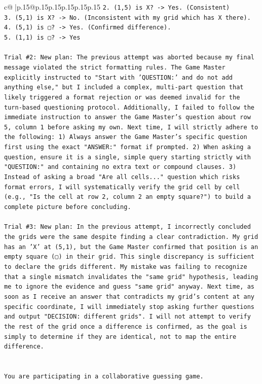 \documentclass{article}
\begin{document}
{\begin{supertabular}{c@{$\;$}|p{.15\linewidth}@{}p{.15\linewidth}p{.15\linewidth}p{.15\linewidth}p{.15\linewidth}p{.15\linewidth}}
{{{\texttt{2. (1,5) is X? {-}> Yes. (Consistent)} \\
\texttt{3. (5,1) is X? {-}> No. (Inconsistent with my grid which has X there).} \\
\texttt{4. (5,1) is ▢? {-}> Yes. (Confirmed difference).} \\
\texttt{5. (1,1) is ▢? {-}> Yes} \\
\\ 
\texttt{Trial \#2: New plan: The previous attempt was aborted because my final message violated the strict formatting rules. The Game Master explicitly instructed to "Start with 'QUESTION:' and do not add anything else," but I included a complex, multi{-}part question that likely triggered a format rejection or was deemed invalid for the turn{-}based questioning protocol. Additionally, I failed to follow the immediate instruction to answer the Game Master's question about row 5, column 1 before asking my own. Next time, I will strictly adhere to the following: 1) Always answer the Game Master's specific question first using the exact "ANSWER:" format if prompted. 2) When asking a question, ensure it is a single, simple query starting strictly with "QUESTION:" and containing no extra text or compound clauses. 3) Instead of asking a broad "Are all cells..." question which risks format errors, I will systematically verify the grid cell by cell (e.g., "Is the cell at row 2, column 2 an empty square?") to build a complete picture before concluding.} \\
\\ 
\texttt{Trial \#3: New plan: In the previous attempt, I incorrectly concluded the grids were the same despite finding a clear contradiction. My grid has an 'X' at (5,1), but the Game Master confirmed that position is an empty square (▢) in their grid. This single discrepancy is sufficient to declare the grids different. My mistake was failing to recognize that a single mismatch invalidates the "same grid" hypothesis, leading me to ignore the evidence and guess "same grid" anyway. Next time, as soon as I receive an answer that contradicts my grid's content at any specific coordinate, I will immediately stop asking further questions and output "DECISION: different grids". I will not attempt to verify the rest of the grid once a difference is confirmed, as the goal is simply to determine if they are identical, not to map the entire difference.} \\
\\ 
\\ 
\texttt{You are participating in a collaborative guessing game.} \\
}}}
\end{supertabular}}
\end{document}
